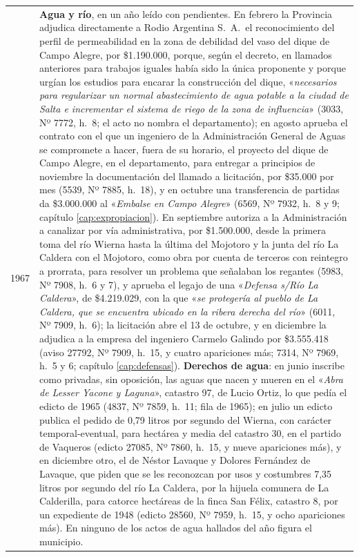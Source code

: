 \begin{longtable}{@{}p{2.7cm}p{10.3cm}@{}}
1967 & \textbf{Agua y río}, en un año leído con pendientes. En febrero la Provincia adjudica directamente a Rodio Argentina S.\ A.\ el reconocimiento del perfil de permeabilidad en la zona de debilidad del vaso del dique de Campo Alegre, por \$1.190.000, porque, según el decreto, en llamados anteriores para trabajos iguales había sido la única proponente y porque urgían los estudios para encarar la construcción del dique, «\textit{necesarios para regularizar un normal abastecimiento de agua potable a la ciudad de Salta e incrementar el sistema de riego de la zona de influencia}» (3033, Nº 7772, h.\ 8; el acto no nombra el departamento); en agosto aprueba el contrato con el que un ingeniero de la Administración General de Aguas se compromete a hacer, fuera de su horario, el proyecto del dique de Campo Alegre, en el departamento, para entregar a principios de noviembre la documentación del llamado a licitación, por \$35.000 por mes (5539, Nº 7885, h.\ 18), y en octubre una transferencia de partidas da \$3.000.000 al «\textit{Embalse en Campo Alegre}» (6569, Nº 7932, h.\ 8 y 9; capítulo \ref{cap:expropiacion}). En septiembre autoriza a la Administración a canalizar por vía administrativa, por \$1.500.000, desde la primera toma del río Wierna hasta la última del Mojotoro y la junta del río La Caldera con el Mojotoro, como obra por cuenta de terceros con reintegro a prorrata, para resolver un problema que señalaban los regantes (5983, Nº 7908, h.\ 6 y 7), y aprueba el legajo de una «\textit{Defensa s/Río La Caldera}», de \$4.219.029, con la que «\textit{se protegería al pueblo de La Caldera, que se encuentra ubicado en la ribera derecha del río}» (6011, Nº 7909, h.\ 6); la licitación abre el 13 de octubre, y en diciembre la adjudica a la empresa del ingeniero Carmelo Galindo por \$3.555.418 (aviso 27792, Nº 7909, h.\ 15, y cuatro apariciones más; 7314, Nº 7969, h.\ 5 y 6; capítulo \ref{cap:defensas}). \textbf{Derechos de agua}: en junio inscribe como privadas, sin oposición, las aguas que nacen y mueren en el «\textit{Abra de Lesser Yacone y Laguna}», catastro 97, de Lucio Ortiz, lo que pedía el edicto de 1965 (4837, Nº 7859, h.\ 11; fila de 1965); en julio un edicto publica el pedido de 0,79 litros por segundo del Wierna, con carácter temporal-eventual, para hectárea y media del catastro 30, en el partido de Vaqueros (edicto 27085, Nº 7860, h.\ 15, y nueve apariciones más), y en diciembre otro, el de Néstor Lavaque y Dolores Fernández de Lavaque, que piden que se les reconozcan por usos y costumbres 7,35 litros por segundo del río La Caldera, por la hijuela comunera de La Calderilla, para catorce hectáreas de la finca San Félix, catastro 8, por un expediente de 1948 (edicto 28560, Nº 7959, h.\ 15, y ocho apariciones más). En ninguno de los actos de agua hallados del año figura el municipio. \\

\end{longtable}
